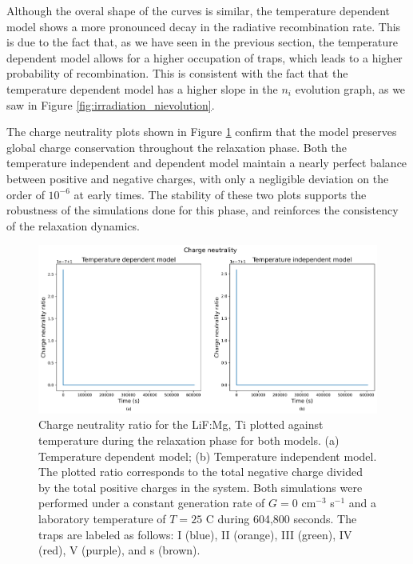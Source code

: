 \vspace{10pt}

Although the overal shape of the curves is similar, the temperature dependent model shows a more pronounced decay in the radiative recombination rate. This is due to the fact that, as we have seen in the previous section, the temperature dependent model allows for a higher occupation of traps, which leads to a higher probability of recombination. This is consistent with the fact that the temperature dependent model has a higher slope in the $n_i$ evolution graph, as we saw in Figure \ref{fig:irradiation_nievolution}.

\vspace{10pt}

The charge neutrality plots shown in Figure \ref{fig:relaxation_chneutrality} confirm that the model preserves global charge conservation throughout the relaxation phase. Both the temperature independent and dependent model maintain a nearly perfect balance between positive and negative charges, with only a negligible deviation on the order of $10^{-6}$ at early times. The stability of these two plots supports the robustness of the simulations done for this phase, and reinforces the consistency of the relaxation dynamics.

\begin{figure}[H]
    \centering
    \includegraphics[width=\textwidth]{Images/Relaxation Charge neutrality.png}
    \caption{Charge neutrality ratio for the LiF:Mg, Ti plotted against temperature during the relaxation phase for both models. (a) Temperature dependent model; (b) Temperature independent model. The plotted ratio corresponds to the total negative charge divided by the total positive charges in the system. Both simulations were performed under a constant generation rate of $G = 0$ cm$^{-3}$ s$^{-1}$ and a laboratory temperature of $T = 25$ \textdegree C during 604,800 seconds. The traps are labeled as follows: I (blue), II (orange), III (green), IV (red), V (purple), and s (brown).}
    \label{fig:relaxation_chneutrality}
\end{figure}

